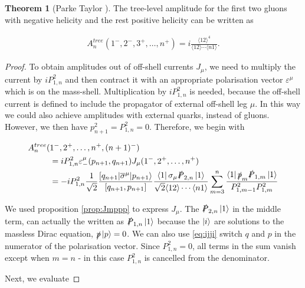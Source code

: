 \documentclass{article}
\theoremstyle{definition}
\newtheorem{theorem}{Theorem}[section]
\numberwithin{equation}{section}
\begin{document}
\begin{theorem}[Parke Taylor \cite{pt86}]

The tree-level amplitude for the first two gluons with negative helicity and the rest positive helicity can be written as

\begin{align}
    A_n^{tree}(1^{-}, 2^{-}, 3^{+}, \dots , n^{+}) = i \frac{\langle 12 \rangle^4}{\langle 12 \rangle \cdots \langle n1 \rangle}.
\end{align}

\end{theorem}

\begin{proof}
To obtain amplitudes out of off-shell currents $J_{\mu}$, we need to multiply the current by $i P_{1,n}^2$ and then contract it with an appropriate polarisation vector $\varepsilon^{\mu}$ which is on the mass-shell. Multiplication by $i P_{1,n}^2$ is needed, because the off-shell current is defined to include the propagator of external off-shell leg $\mu$. In this way we could also achieve amplitudes with external quarks, instead of gluons. However, we then have $p_{n+1}^2 = P_{1,n}^2 = 0$. Therefore, we begin with

\begin{align}
    A_n^{tree}(&1^{-}, 2^{+}, \dots , n^{+}, (n+1)^{-}) \\
    &= i P_{1,n}^2 \varepsilon_{-}^{\mu}(p_{n+1}, q_{n+1}) J_{\mu}(1^{-}, 2^{+}, \dots , n^{+}) \\
    &= - i P_{1,n}^2 \frac{1}{\sqrt{2}} \frac{ \lbrack q_{n+1} | \overline{\sigma}^{\mu} | p_{n+1} \rangle }{ \lbrack q_{n+1}, p_{n+1} \rbrack } \frac{ \bra{1} \sigma_{\mu} \slashed{P}_{2,n} \ket{1} }{ \sqrt{2} \langle 12 \rangle \cdots \langle n1 \rangle } \sum_{m=3}^{n} \frac{ \bra{1} \slashed{p}_m \slashed{P}_{1,m} \ket{1} }{ P_{1,m-1}^2 P_{1,m}^2 }
\end{align}

We used proposition \ref{prop:Jmppp} to express $J_{\mu}$. The $\slashed{P}_{2,n} \ket{1}$ in the middle term, can actually the written as $\slashed{P}_{1,n} \ket{1}$ because the $\ket{i}$ are solutions to the massless Dirac equation, $\slashed{p} \ket{p} = 0$. We can also use \eqref{eq:ijji} switch $q$ and $p$ in the numerator of the polarisation vector. Since $P_{1,n}^2 = 0$, all terms in the sum vanish except when $m=n$ - in this case $P_{1,n}^2$ is cancelled from the denominator.

Next, we evaluate


\end{proof}
\end{document}
